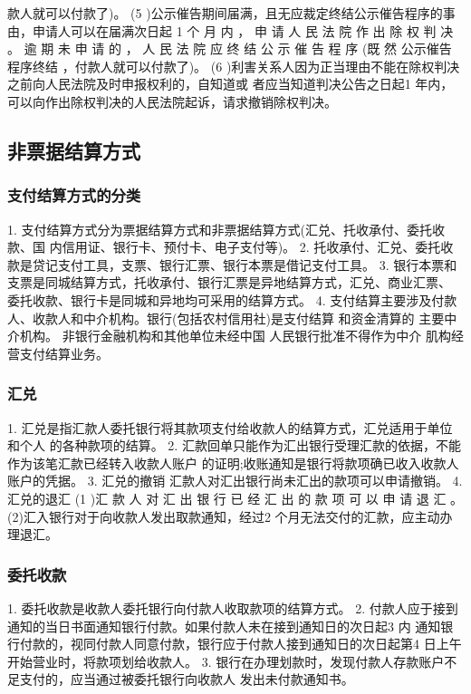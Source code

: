 \documentclass[UTF8,12pt]{ctexart}
\numberwithin{equation}{section} %
\numberwithin{figure}{section}
\numberwithin{table}{section}
\begin{document}
	
	款人就可以付款了)。
	(5 )公示催告期间届满，且无应裁定终结公示催告程序的事由，申请人可以在届满次日起
	1 个 月 内 ， 申 请 人 民 法 院 作 出 除 权 判 决 。 逾 期 未 申 请 的 ， 人 民 法 院 应 终 结 公 示 催 告 程 序 (既 然
	公示催告程序终结 ，付款人就可以付款了)。
	(6 )利害关系人因为正当理由不能在除权判决之前向人民法院及时申报权利的，自知道或
	者应当知道判决公告之日起1 年内，可以向作出除权判决的人民法院起诉，请求撤销除权判决。
	
	\subsection{非票据结算方式}
	
	\subsubsection{支付结算方式的分类} 
	1. 支付结算方式分为票据结算方式和非票据结算方式(汇兑、托收承付、委托收款、国
	内信用证、银行卡、预付卡、电子支付等)。
	2. 托收承付、汇兑、委托收款是贷记支付工具，支票、银行汇票、银行本票是借记支付工具。
	3. 银行本票和支票是同城结算方式，托收承付、银行汇票是异地结算方式，汇兑、商业汇票、
	委托收款、银行卡是同城和异地均可采用的结算方式。
	4. 支付结算主要涉及付款人、收款人和中介机构。银行(包括农村信用社)是支付结算
	和资金清算的 主要中介机构。 非银行金融机构和其他单位未经中国 人民银行批准不得作为中介
	肌构经营支付结算业务。
	
	\subsubsection{汇兑}
	1. 汇兑是指汇款人委托银行将其款项支付给收款人的结算方式，汇兑适用于单位和个人
	的各种款项的结算。
	2. 汇款回单只能作为汇出银行受理汇款的依据，不能作为该笔汇款已经转入收款人账户
	的证明;收账通知是银行将款项确已收入收款人账户的凭据。
	3. 汇兑的撤销
	汇款人对汇出银行尚未汇出的款项可以申请撤销。
	4. 汇兑的退汇
	(1 )汇 款 人 对 汇 出 银 行 已 经 汇 出 的 款 项 可 以 申 请 退 汇 。
	(2)汇入银行对于向收款人发出取款通知，经过2 个月无法交付的汇款，应主动办理退汇。
	
	\subsubsection{委托收款} 
	1. 委托收款是收款人委托银行向付款人收取款项的结算方式。
	2. 付款人应于接到通知的当日书面通知银行付款。如果付款人未在接到通知日的次日起3
	内 通知银行付款的，视同付款人同意付款，银行应于付款人接到通知日的次日起第4 日上午
	开始营业时，将款项划给收款人。
	3. 银行在办理划款时，发现付款人存款账户不足支付的，应当通过被委托银行向收款人
	发出未付款通知书。
	
\end{document}

